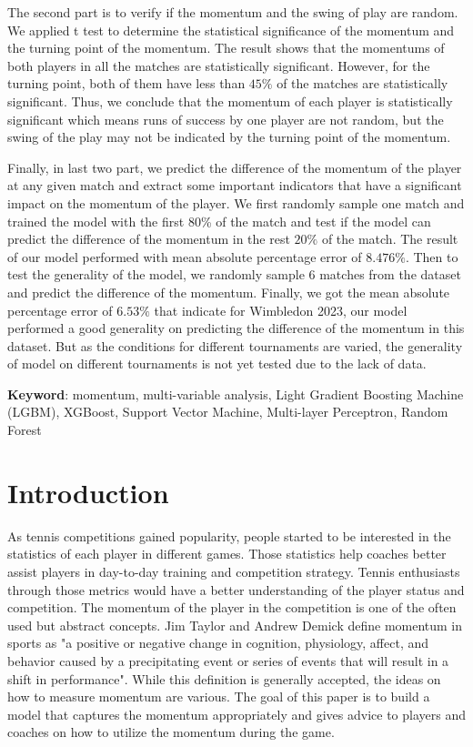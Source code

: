 \documentclass[12pt]{article}
\begin{document}
The second part is to verify if the momentum and the swing of play are random. We applied t test to determine the statistical significance of the momentum and the turning point of the momentum. 
The result shows that the momentums of both players in all the matches are statistically significant. However, for the turning point, both of them have less than $45\%$ of the matches are statistically significant. Thus, we conclude that the momentum of each player is statistically significant which means runs of success by one player are not random, but the swing of the play may not be indicated by the turning point of the momentum.

Finally, in last two part, we predict the difference of the momentum of the player at any given match and extract some important indicators that have a significant impact on the momentum of the player. 
We first randomly sample one match and trained the model with the first 80\% of the match and test if the model can predict the difference of the momentum in the rest $20\%$ of the match. The result of our model performed with mean absolute percentage error of $8.476\%$.
Then to test the generality of the model, we randomly sample 6 matches from the dataset and predict the difference of the momentum. Finally, we got the mean absolute percentage error of $6.53\%$ that indicate for Wimbledon 2023, our model performed a good generality on predicting the difference of the momentum in this dataset. But as the conditions for different tournaments are varied, the generality of model on different tournaments is not yet tested due to the lack of data.

\textbf{Keyword}: momentum, multi-variable analysis, Light Gradient Boosting Machine (LGBM), XGBoost, Support Vector Machine, Multi-layer Perceptron, Random Forest



\clearpage
\pagestyle{fancy}
\newpage
\setcounter{page}{2}
\tableofcontents 
\newpage
\section{Introduction}
\quad As tennis competitions gained popularity, people started to be interested in the statistics of each player in different games. Those statistics help coaches better assist players in day-to-day training and competition strategy. Tennis enthusiasts through those metrics would have a better understanding of the player status and competition. The momentum of the player in the competition is one of the often used but abstract concepts. Jim Taylor and Andrew Demick define momentum in sports as "a positive or negative change in cognition, physiology, affect, and behavior caused by a precipitating event or series of events that will result in a shift in performance"\cite{definition-tennis}. While this definition is generally accepted, the ideas on how to measure momentum are various. The goal of this paper is to build a model that captures the momentum appropriately and gives advice to players and coaches on how to utilize the momentum during the game.
\end{document}
